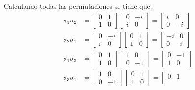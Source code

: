 Calculando todas las permutaciones se tiene que:
\begin{align*}
    \sigma_1 \sigma_2 &= \left[\begin{matrix}
        0 & 1\\
        1 & 0
    \end{matrix}\right]
    \left[\begin{matrix}
        0 & -i\\
        i & 0
    \end{matrix}\right] = 
    \left[\begin{matrix}
        i & 0\\
        0 & -i
    \end{matrix}\right] \\
    \sigma_2 \sigma_1 &= \left[\begin{matrix}
        0 & -i\\
        i & 0
    \end{matrix}\right]
    \left[\begin{matrix}
        0 & 1\\
        1 & 0
    \end{matrix}\right] = 
    \left[\begin{matrix}
        -i & 0\\
        0 & i
    \end{matrix}\right] \\
    \sigma_1 \sigma_3 &= \left[\begin{matrix}
        0 & 1\\
        1 & 0
    \end{matrix}\right]
    \left[\begin{matrix}
        1 & 0\\
        0 & -1
    \end{matrix}\right] = 
    \left[\begin{matrix}
        0 & -1\\
        1 & 0
    \end{matrix}\right] \\
    \sigma_3 \sigma_1 &= 
    \left[\begin{matrix}
        1 & 0\\
        0 & -1
    \end{matrix}\right]
    \left[\begin{matrix}
        0 & 1\\
        1 & 0
    \end{matrix}\right] = 
    \left[\begin{matrix}
        0 & 1\\

\end{matrix}
\end{align*}
